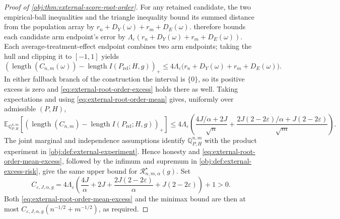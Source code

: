 \begin{proof}[Proof of \cref{obj:thm:external-score-root-order}]
For any retained candidate, the two empirical-ball inequalities and the triangle inequality bound its summed distance from the population array by \(r_n+D_Y(\omega)+r_m+D_E(\omega)\).  therefore bounds each candidate arm endpoint's error by
\(\Lambda_\varepsilon(r_n+D_Y(\omega)+r_m+D_E(\omega))\). Each average-treatment-effect endpoint combines two arm endpoints; taking the hull and clipping it to \([-1,1]\) yields
\[
\left(\operatorname{length}(C_{n,m}(\omega))
-\operatorname{length}I(P_{\mathrm{rel}};H,g)\right)_+
\leq
4\Lambda_\varepsilon
 \bigl(r_n+D_Y(\omega)+r_m+D_E(\omega)\bigr). \label{eq:external-root-order-excess}
\]
In either fallback branch of the construction the interval is \(\{0\}\), so its positive excess is zero and \cref{eq:external-root-order-excess} holds there as well. Taking expectations and using \cref{eq:external-root-order-mean} gives, uniformly over admissible \((P,H)\),
\[
\mathbb E_{\mathbb Q_{P,H}^{n,m}}
 \left[\left(\operatorname{length}(C_{n,m})
-\operatorname{length}I(P_{\mathrm{rel}};H,g)\right)_+\right]
\leq
4\Lambda_\varepsilon
 \left(
 \frac{4J/\alpha+2J}{\sqrt n}
 +\frac{2J(2-2\varepsilon)/\alpha+J(2-2\varepsilon)}{\sqrt m}
 \right). \label{eq:external-root-order-mean-excess}
\]
The joint marginal and independence assumptions identify \(\mathbb Q_{P,H}^{n,m}\) with the product experiment in \cref{obj:def:external-experiment}. Hence honesty and \cref{eq:external-root-order-mean-excess}, followed by the infimum and supremum in \cref{obj:def:external-excess-risk}, give the same upper bound for \(\mathcal R^\star_{n,m,\alpha}(g)\). Set
\[
C_{\varepsilon,J,\alpha,g}
=
4\Lambda_\varepsilon
 \left(\frac{4J}{\alpha}+2J
       +\frac{2J(2-2\varepsilon)}{\alpha}
       +J(2-2\varepsilon)\right)+1>0.
\]
Both \cref{eq:external-root-order-mean-excess} and the minimax bound are then at most
\(C_{\varepsilon,J,\alpha,g}(n^{-1/2}+m^{-1/2})\), as required. %


\end{proof}

